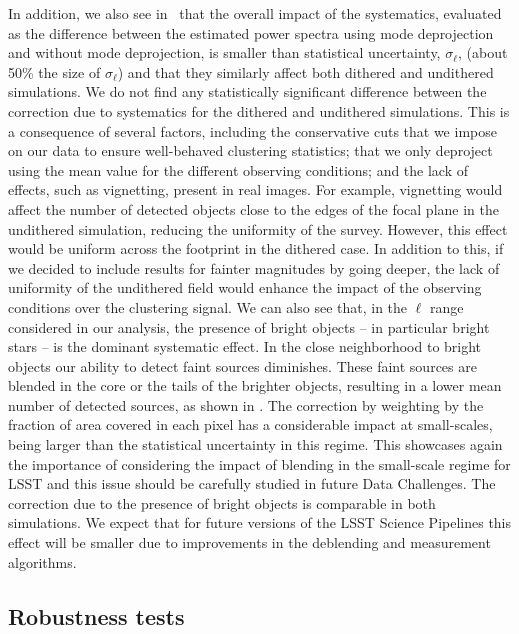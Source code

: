 \documentclass[a4paper,fleqn,usenatbib]{mnras}
\begin{document}
In addition, we also see in~ that the overall impact of the systematics, evaluated as the difference between the estimated power spectra using mode deprojection and without mode deprojection, is smaller than statistical uncertainty, $\sigma_{\ell}$, (about 50\% the size of $\sigma_{\ell}$) and that they similarly affect both dithered and undithered simulations. We do not find any statistically significant difference between the correction due to systematics for the dithered and undithered simulations. This is a consequence of several factors, including the conservative cuts that we impose on our data to ensure well-behaved clustering statistics; that we only deproject using the mean value for the different observing conditions; and the lack of effects, such as vignetting, present in real images. For example, vignetting would affect the number of detected objects close to the edges of the focal plane in the undithered simulation, reducing the uniformity of the survey. However, this effect would be uniform across the footprint in the dithered case. In addition to this, if we decided to include results for fainter magnitudes by going deeper, the lack of uniformity of the undithered field would enhance the impact of the observing conditions over the clustering signal. We can also see that, in the $\ell$ range considered in our analysis, the presence of bright objects -- in particular bright stars -- is the dominant systematic effect. In the close neighborhood to bright objects our ability to detect faint sources diminishes. These faint sources are blended in the core or the tails of the brighter objects, resulting in a lower mean number of detected sources, as shown in . The correction by weighting by the fraction of area covered in each pixel has a considerable impact at small-scales, being larger than the statistical uncertainty in this regime. This showcases again the importance of considering the impact of blending in the small-scale regime for LSST and this issue should be carefully studied in future Data Challenges. The correction due to the presence of bright objects is comparable in both simulations. We expect that for future versions of the LSST Science Pipelines this effect will be smaller due to improvements in the deblending and measurement algorithms.

\subsection{Robustness tests}
\label{ssec:robustness}
\end{document}
